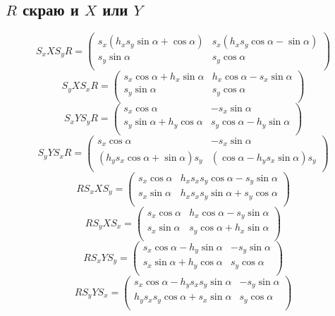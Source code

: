 \subsection{$R$ скраю и $X$ или $Y$}

$$S_xXS_yR = \begin{pmatrix} s_x \left( h_x s_y \sin\alpha + \cos\alpha \right) & s_x \left( h_x s_y \cos\alpha - \sin\alpha \right) \\ s_y \sin\alpha & s_y \cos\alpha \\ \end{pmatrix} $$
$$S_yXS_xR = \begin{pmatrix} s_x \cos\alpha + h_x \sin\alpha & h_x \cos\alpha - s_x \sin\alpha \\ s_y \sin\alpha & s_y \cos\alpha \\ \end{pmatrix} $$
$$S_xYS_yR = \begin{pmatrix} s_x \cos\alpha & - s_x \sin\alpha \\ s_y \sin\alpha + h_y \cos\alpha & s_y \cos\alpha - h_y \sin\alpha \\ \end{pmatrix} $$
$$S_yYS_xR = \begin{pmatrix} s_x \cos\alpha & - s_x \sin\alpha \\ \left( h_y s_x \cos\alpha + \sin\alpha \right) s_y & \left( \cos\alpha - h_y s_x \sin\alpha \right) s_y \\ \end{pmatrix} $$
$$RS_xXS_y = \begin{pmatrix} s_x \cos\alpha & h_x s_x s_y \cos\alpha - s_y \sin\alpha \\ s_x \sin\alpha & h_x s_x s_y \sin\alpha + s_y \cos\alpha \\ \end{pmatrix} $$
$$RS_yXS_x = \begin{pmatrix} s_x \cos\alpha & h_x \cos\alpha - s_y \sin\alpha \\ s_x \sin\alpha & s_y \cos\alpha + h_x \sin\alpha \\ \end{pmatrix} $$
$$RS_xYS_y = \begin{pmatrix} s_x \cos\alpha - h_y \sin\alpha & - s_y \sin\alpha \\ s_x \sin\alpha + h_y \cos\alpha & s_y \cos\alpha \\ \end{pmatrix} $$
$$RS_yYS_x = \begin{pmatrix} s_x \cos\alpha - h_y s_x s_y \sin\alpha & - s_y \sin\alpha \\ h_y s_x s_y \cos\alpha + s_x \sin\alpha & s_y \cos\alpha \\ \end{pmatrix} $$ 

